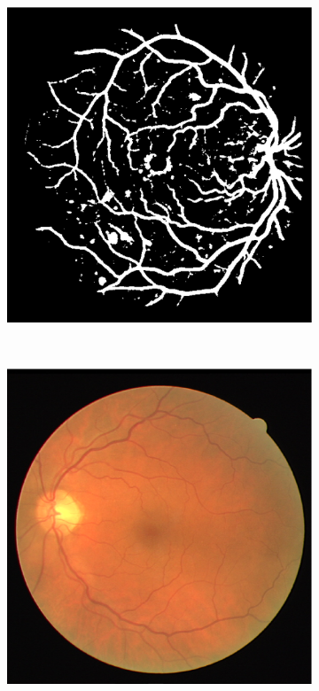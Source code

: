 \documentclass[aps,prb,10pt,twocolumn,groupedaddress]{revtex4-1}
\begin{document}
\begin{figure}[!t]
\begin{subfigure}[]{0.22\textwidth}
		\caption{}
	\end{subfigure}
	\hspace{0.25cm}
	\centering
	\begin{subfigure}[]{0.22\textwidth}
		\centering
		\includegraphics[width=\textwidth]{images/14_test_rf_lowest_accuracy_89.eps}
		\caption{}
	\end{subfigure}\\
	\vspace{0.25cm}
	\centering
	\begin{subfigure}[]{0.22\textwidth}
		\centering
		\includegraphics[width=\textwidth]{images/09_test.eps}

\end{subfigure}
\end{figure}
\end{document}

